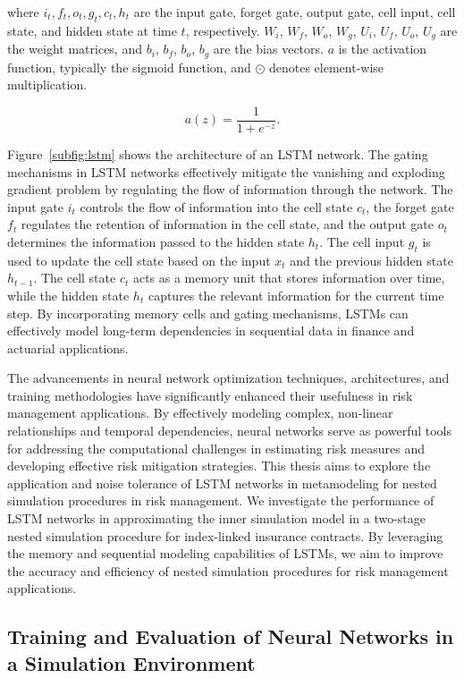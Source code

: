 where $i_t, f_t, o_t, g_t, c_t, h_t$ are the input gate, forget gate, output gate, cell input, cell state, and hidden state at time $t$, respectively.
$W_i$, $W_f$, $W_o$, $W_g$, $U_i$, $U_f$, $U_o$, $U_g$ are the weight matrices, and $b_i$, $b_f$, $b_o$, $b_g$ are the bias vectors.
$a$ is the activation function, typically the sigmoid function, and $\odot$ denotes element-wise multiplication.

\begin{equation*}
    a(z) = \frac{1}{1 + e^{-z}}.
\end{equation*}

Figure~\ref{subfig:lstm} shows the architecture of an LSTM network.
The gating mechanisms in LSTM networks effectively mitigate the vanishing and exploding gradient problem by regulating the flow of information through the network.
The input gate $i_t$ controls the flow of information into the cell state $c_t$, the forget gate $f_t$ regulates the retention of information in the cell state, and the output gate $o_t$ determines the information passed to the hidden state $h_t$.
The cell input $g_t$ is used to update the cell state based on the input $x_t$ and the previous hidden state $h_{t-1}$.
The cell state $c_t$ acts as a memory unit that stores information over time, while the hidden state $h_t$ captures the relevant information for the current time step.
By incorporating memory cells and gating mechanisms, LSTMs can effectively model long-term dependencies in sequential data in finance and actuarial applications.

The advancements in neural network optimization techniques, architectures, and training methodologies have significantly enhanced their usefulness in risk management applications.
By effectively modeling complex, non-linear relationships and temporal dependencies, neural networks serve as powerful tools for addressing the computational challenges in estimating risk measures and developing effective risk mitigation strategies.
This thesis aims to explore the application and noise tolerance of LSTM networks in metamodeling for nested simulation procedures in risk management.
We investigate the performance of LSTM networks in approximating the inner simulation model in a two-stage nested simulation procedure for index-linked insurance contracts.
By leveraging the memory and sequential modeling capabilities of LSTMs, we aim to improve the accuracy and efficiency of nested simulation procedures for risk management applications.

\subsection{Training and Evaluation of Neural Networks in a Simulation Environment}

